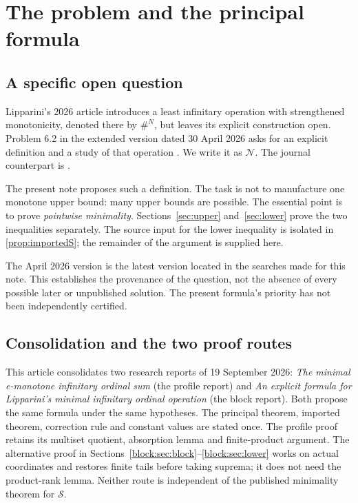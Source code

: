 \documentclass[11pt,a4paper]{article}
\theoremstyle{definition}
\newcommand{\OpN}{\mathcal N}
\newcommand{\OpS}{\mathcal S}
\begin{document}
{\small\setlength{\parskip}{0pt}
\tableofcontents}
\newpage

\section{The problem and the principal formula}\label{sec:main}

\subsection{A specific open question}
Lipparini's 2026 article introduces a least infinitary operation with
strengthened monotonicity, denoted there by $\#^N$, but leaves its explicit
construction open. Problem 6.2 in the extended version dated 30 April 2026
asks for an explicit definition and a study of that operation
\cite[Problem 6.2; Theorem 2.6.a(A)]{Lipparini2026extended}.
We write it as $\OpN$. The journal counterpart is \cite{Lipparini2026published}.

The present note proposes such a definition. The task is not to manufacture
one monotone upper bound: many upper bounds are possible. The essential point
is to prove \emph{pointwise minimality}. Sections~\ref{sec:upper}
and~\ref{sec:lower} prove the two inequalities separately. The source input for
the lower inequality is isolated in \cref{prop:importedS}; the remainder of the
argument is supplied here.

The April 2026 version is the latest version located in the searches made for
this note. This establishes the provenance of the question, not the absence
of every possible later or unpublished solution. The present formula's
priority has not been independently certified.


\subsection{Consolidation and the two proof routes}\label{merge:routes}
This article consolidates two research reports of 19 September 2026:
\emph{The minimal e-monotone infinitary ordinal sum} (the profile report)
and \emph{An explicit formula for Lipparini's minimal infinitary ordinal
operation} (the block report). Both propose the same formula under the same
hypotheses. The principal theorem, imported theorem, correction rule and
constant values are stated once. The profile proof retains its multiset
quotient, absorption lemma and finite-product argument. The alternative
proof in Sections~\ref{block:sec:block}--\ref{block:sec:lower} works on actual
coordinates and restores finite tails before taking suprema; it does not
need the product-rank lemma. Neither route is independent of the published
minimality theorem for $\OpS$.
\end{document}
